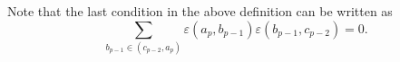 \begin{remark}
  Note that the last condition in the above definition can be written as
  \begin{equation}
    \sum_{b_{p - 1} \in (c_{p - 2}, a_p)}
    \varepsilon(a_p, b_{p - 1}) \varepsilon(b_{p - 1}, c_{p - 2}) = 0.
  \end{equation}
\end{remark}
